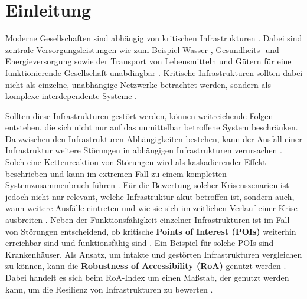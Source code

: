 

\section{Einleitung}
\label{sec:einleitung}


Moderne Gesellschaften sind abhängig von kritischen Infrastrukturen \cite{lickert2024}.
Dabei sind zentrale Versorgungsleistungen wie zum Beispiel Wasser-, Gesundheits- und Energieversorgung sowie der Transport von Lebensmitteln und Gütern für eine funktionierende Gesellschaft unabdingbar \cite{lickert2024,chiaradonna2007}.
Kritische Infrastrukturen sollten dabei nicht als einzelne, unabhängige Netzwerke betrachtet werden, sondern als komplexe interdependente Systeme \cite{chiaradonna2007}.

Sollten diese Infrastrukturen gestört werden, können weitreichende Folgen entstehen, die sich nicht nur auf das unmittelbar betroffene System beschränken.
Da zwischen den Infrastrukturen Abhängigkeiten bestehen, kann der Ausfall einer Infrastruktur weitere Störungen in abhängigen Infrastrukturen verursachen \cite{laprie2007}.
Solch eine Kettenreaktion von Störungen wird als kaskadierender Effekt beschrieben und kann im extremen Fall zu einem kompletten Systemzusammenbruch führen \cite{laprie2007,buldyrev2010}.
Für die Bewertung solcher Krisenszenarien ist jedoch nicht nur relevant, welche Infrastruktur akut betroffen ist, sondern auch, wann weitere Ausfälle eintreten und wie sie sich im zeitlichen Verlauf einer Krise ausbreiten \cite{lickert2024}.
Neben der Funktionsfähigkeit einzelner Infrastrukturen ist im Fall von Störungen entscheidend, ob kritische \textbf{Points of Interest (POIs)} weiterhin erreichbar sind und funktionsfähig sind \cite{kaub2024}. Ein Beispiel für solche POIs sind Krankenhäuser.
Als Ansatz, um intakte und gestörten Infrastrukturen vergleichen zu können, kann die \textbf{Robustness of Accessibility (RoA)} genutzt werden \cite{kaub2024}. Dabei handelt es sich beim RoA-Index um einen Maßstab, der genutzt werden kann, um die Resilienz von Infrastrukturen zu bewerten \cite{kaub2024}.

